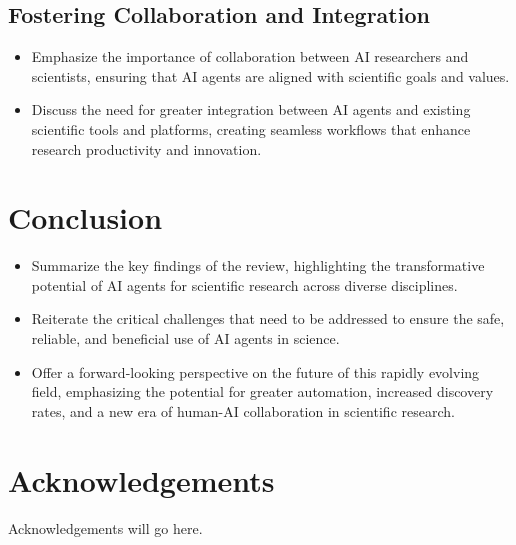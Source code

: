 \documentclass{article}
\begin{document}
\subsection{Fostering Collaboration and Integration}
\begin{itemize}
    \item Emphasize the importance of collaboration between AI researchers and scientists, ensuring that AI agents are aligned with scientific goals and values.
    \item Discuss the need for greater integration between AI agents and existing scientific tools and platforms, creating seamless workflows that enhance research productivity and innovation.
\end{itemize}

\section{Conclusion}
\begin{itemize}
    \item Summarize the key findings of the review, highlighting the transformative potential of AI agents for scientific research across diverse disciplines.
    \item Reiterate the critical challenges that need to be addressed to ensure the safe, reliable, and beneficial use of AI agents in science.
    \item Offer a forward-looking perspective on the future of this rapidly evolving field, emphasizing the potential for greater automation, increased discovery rates, and a new era of human-AI collaboration in scientific research.
\end{itemize}

\section*{Acknowledgements}

Acknowledgements will go here.



\end{document}
